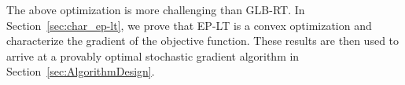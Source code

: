 The above optimization is more challenging than GLB-RT. In
Section~\ref{sec:char_ep-lt}, we prove that EP-LT is a convex
optimization and characterize the gradient of the objective
function. These results are then used to arrive at a provably optimal stochastic gradient algorithm in Section~\ref{sec:AlgorithmDesign}.
